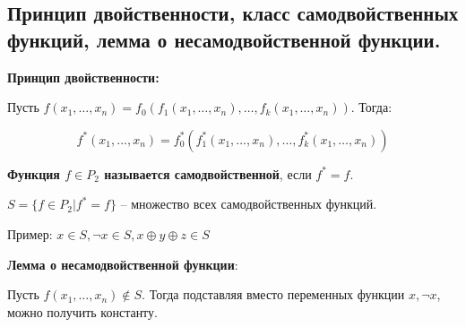 \subsection{Принцип двойственности, класс самодвойственных функций, лемма о несамодвойственной функции.}

\textbf{Принцип двойственности:}  

   Пусть $f(x_1,\ldots,x_n) = f_0(f_1(x_1,\ldots,x_n),\ldots,f_k(x_1,\ldots,x_n))$. Тогда:

   $$f^*(x_1,\ldots,x_n) = f_0^*(f_1^*(x_1,\ldots,x_n),\ldots,f_k^*(x_1,\ldots,x_n))$$

 \textbf{Функция $f \in P_2$ называется самодвойственной}, если $f^* = f$.

  $S = \{f \in P_2 | f^* = f\}$ -- множество всех самодвойственных функций.

  Пример: $x \in S, \neg x \in S, x \oplus y \oplus z \in S$

  \textbf{Лемма о несамодвойственной функции}:

   Пусть $f(x_1, \ldots, x_n) \notin S$. Тогда подставляя вместо переменных функции $x, \neg x$, можно получить константу.
